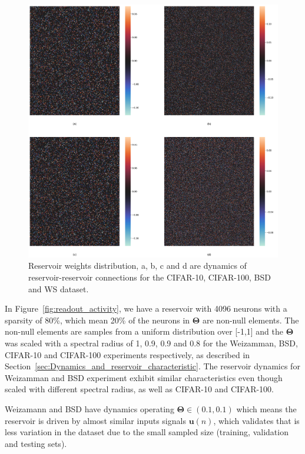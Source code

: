 \documentclass{WitsPhysicsReport}
\begin{document}
\begin{figure}[H]
\centering
  \includegraphics[width=1\textwidth]{Figure/Results/Reservoir_activity_Reservoir_weights_activity_.png}
 \caption{Reservoir weights distribution, a, b, c and d are dynamics of reservoir-reservoir connections for the CIFAR-10, CIFAR-100, BSD and WS dataset.}
 \label{fig:reservoir_activity}
\end{figure}

In Figure~\ref{fig:readout_activity}, we have a reservoir with 4096 neurons with a sparsity of 80\%, which mean 20\% of the neurons in  ${\mathbf{\Theta}}$ are non-null elements. The non-null elements are samples from a uniform distribution over [-1,1] and the ${\mathbf{\Theta}}$ was scaled with a spectral radius of 1, 0.9, 0.9 and 0.8 for the Weizamman, BSD, CIFAR-10 and CIFAR-100 experiments respectively, as described in Section~\ref{sec:Dynamics_and_reservoir_characteristic}.  The reservoir dynamics for Weizamman and BSD experiment exhibit similar characteristics even though scaled with different spectral radius, as well as CIFAR-10 and CIFAR-100. 

Weizamann and BSD have dynamics operating ${\mathbf{\Theta}} \in(0.1, 0.1)$ which means the reservoir is driven by almost similar inputs signals $\mathbf{u}(n)$, which validates that is less variation in the dataset due to the small sampled size (training, validation and testing sets). 
\end{document}
